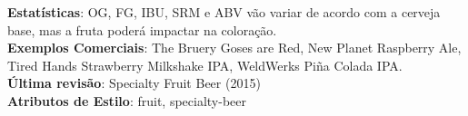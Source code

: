 \textbf{Estatísticas}: OG, FG, IBU, SRM e ABV vão variar de acordo com a cerveja base, mas a fruta poderá impactar na coloração. \\
\textbf{Exemplos Comerciais}: The Bruery Goses are Red, New Planet Raspberry Ale, Tired Hands Strawberry Milkshake IPA, WeldWerks Piña Colada IPA. \\
\textbf{Última revisão}: Specialty Fruit Beer (2015) \\
\textbf{Atributos de Estilo}: fruit, specialty-beer
